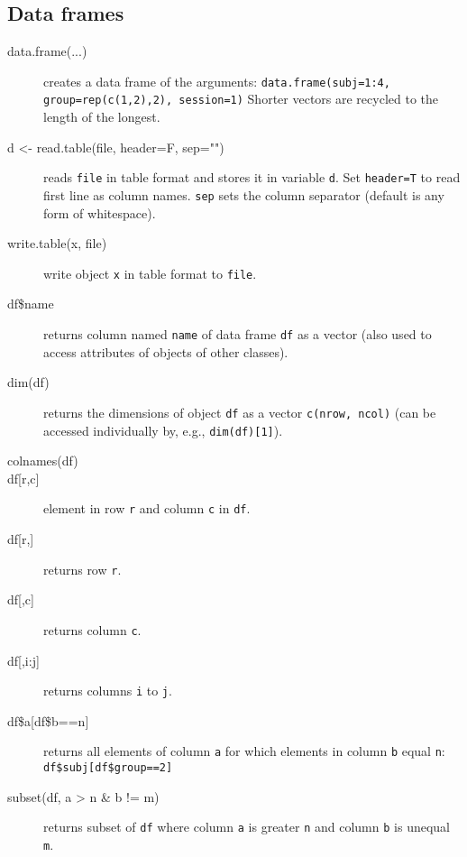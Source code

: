 \documentclass[a4paper,9pt]{extarticle}
\begin{document}
\begin{multicols}{3}
\section{Data frames}
\begin{description}
\item[data.frame(...)] creates a data frame of the arguments: \texttt{data.frame(subj=1:4, group=rep(c(1,2),2), session=1)}
Shorter vectors are recycled to the length of the longest.
\item[d <- read.table(file, header=F, sep="")] reads \texttt{file} in table format and stores it in variable \texttt{d}. Set \texttt{header=T} to read first line as column names. \texttt{sep} sets the column separator (default is any form of whitespace).
\item[write.table(x, file)] write object \texttt{x} in table format to \texttt{file}.
\item[df\$name] returns column named \texttt{name} of data frame \texttt{df} as a vector (also used to access attributes of objects of other classes).
\item[dim(df)] returns the dimensions of object \texttt{df} as a vector \texttt{c(nrow, ncol)} (can be accessed individually by, e.g., \texttt{dim(df)[1]}).
\item[colnames(df)]
\item[df{[r,c]}] element in row \texttt{r} and column \texttt{c} in \texttt{df}.
\item[df{[r,]}] returns row \texttt{r}.
\item[df{[,c]}] returns column \texttt{c}.
\item[df{[,i:j]}] returns columns \texttt{i} to \texttt{j}.
\item[df\$a{[df\$b==n]}] returns all elements of column \texttt{a} for which elements in column \texttt{b} equal \texttt{n}: \texttt{df\$subj[df\$group==2]}
\item[subset(df, a > n \& b != m)] returns subset of \texttt{df} where column \texttt{a} is greater \texttt{n} and column \texttt{b} is unequal \texttt{m}.  
\end{description}


\end{multicols}
\end{document}
